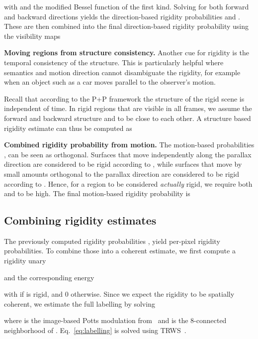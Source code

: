 \documentclass[10pt,twocolumn,letterpaper]{article}
\begin{document}
with  and
 the modified Bessel function of the first kind.
Solving for both forward and backward directions yields the direction-based rigidity probabilities  and .
These are then combined into the final direction-based rigidity probability using the visibility maps






\noindent
{\bf Moving regions from structure consistency.}
Another cue for rigidity is the temporal consistency of the structure.
This is particularly helpful where semantics and motion direction cannot disambiguate the rigidity, for example when an object such as a car moves parallel to the observer's motion. 

Recall that according to the P+P framework the structure of the rigid scene is independent of time.
In rigid regions that are visible in all frames, we assume the forward and backward structure  and  to be close to each other.
A structure based rigidity estimate  can thus be computed as


\noindent
{\bf Combined rigidity probability from motion.}
The motion-based probabilities ,  can be seen as orthogonal. Surfaces that move independently along the parallax direction are considered to be rigid according to , while surfaces that move by small amounts orthogonal to the parallax direction are considered to be rigid according to .
Hence, for a region to be considered \textit{actually} rigid, we require both  and  to be high.
The final motion-based rigidity probability  is


\subsection{Combining rigidity estimates}
\noindent
The previously computed rigidity probabilities , 
yield per-pixel rigidity probabilities.
To combine those into a coherent estimate, we first compute a rigidity unary

and the corresponding energy

with  if  is rigid, and 0 otherwise.
Since we expect the rigidity to be spatially coherent, 
we estimate the full labelling by solving 

where  is the image-based Potts modulation from~\cite{Rother:Grabcut} and  is the 8-connected neighborhood of .
Eq.~\eqref{eq:labelling} is solved using TRWS~\cite{TRWS}.
\end{document}
